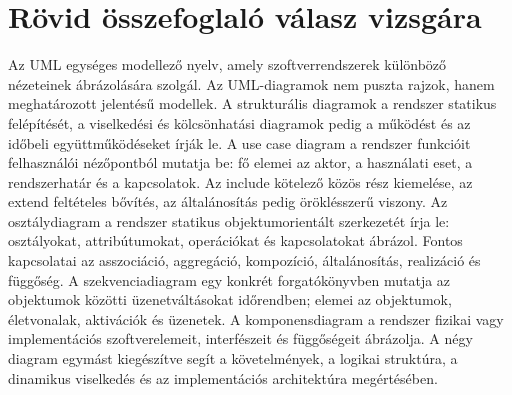 \section{Rövid összefoglaló válasz vizsgára}

\begin{summarybox}
Az UML egységes modellező nyelv, amely szoftverrendszerek különböző nézeteinek ábrázolására szolgál. Az UML-diagramok nem puszta rajzok, hanem meghatározott jelentésű modellek. A strukturális diagramok a rendszer statikus felépítését, a viselkedési és kölcsönhatási diagramok pedig a működést és az időbeli együttműködéseket írják le. A use case diagram a rendszer funkcióit felhasználói nézőpontból mutatja be: fő elemei az aktor, a használati eset, a rendszerhatár és a kapcsolatok. Az include kötelező közös rész kiemelése, az extend feltételes bővítés, az általánosítás pedig öröklésszerű viszony. Az osztálydiagram a rendszer statikus objektumorientált szerkezetét írja le: osztályokat, attribútumokat, operációkat és kapcsolatokat ábrázol. Fontos kapcsolatai az asszociáció, aggregáció, kompozíció, általánosítás, realizáció és függőség. A szekvenciadiagram egy konkrét forgatókönyvben mutatja az objektumok közötti üzenetváltásokat időrendben; elemei az objektumok, életvonalak, aktivációk és üzenetek. A komponensdiagram a rendszer fizikai vagy implementációs szoftverelemeit, interfészeit és függőségeit ábrázolja. A négy diagram egymást kiegészítve segít a követelmények, a logikai struktúra, a dinamikus viselkedés és az implementációs architektúra megértésében.
\end{summarybox}

